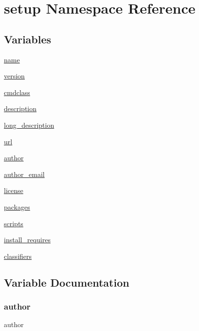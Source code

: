\hypertarget{namespacesetup}{}\section{setup Namespace Reference}
\label{namespacesetup}
\subsection*{Variables}
\begin{DoxyCompactItemize}
\item 
\hyperlink{namespacesetup_ab74e6bf80237ddc4109968cedc58c151}{name}
\item 
\hyperlink{namespacesetup_a4c7a521b8f1a0769c09bfa4a1fca7dab}{version}
\item 
\hyperlink{namespacesetup_a276d559b30d761be0725f763208d1793}{cmdclass}
\item 
\hyperlink{namespacesetup_a2661f439a4a94ffdcd5e47ae1da0bb1d}{description}
\item 
\hyperlink{namespacesetup_a9ebe7fd07c3a4ff67a954bcd8838c42f}{long\+\_\+description}
\item 
\hyperlink{namespacesetup_afcd5a3e84f2adb7f83fa6c99911f31e4}{url}
\item 
\hyperlink{namespacesetup_ad50afb6ec7b2501164b80a0480596ded}{author}
\item 
\hyperlink{namespacesetup_aa0684bedaf8c5c409060306e443a7742}{author\+\_\+email}
\item 
\hyperlink{namespacesetup_a4e659be027e258b72df12349200a263e}{license}
\item 
\hyperlink{namespacesetup_a5191bfd75a28371588f75471591d5500}{packages}
\item 
\hyperlink{namespacesetup_a7849f11e82b8ea592ade76ea0817dbc2}{scripts}
\item 
\hyperlink{namespacesetup_a047d4e9f7b152e767f7bd459218fe1fd}{install\+\_\+requires}
\item 
\hyperlink{namespacesetup_a6b43ae64a9080a1ac074dbd3c294bf9d}{classifiers}
\end{DoxyCompactItemize}


\subsection{Variable Documentation}
\mbox{\label{namespacesetup_ad50afb6ec7b2501164b80a0480596ded}} 
\subsubsection{\texorpdfstring{author}{author}}
{\footnotesize\ttfamily author}

